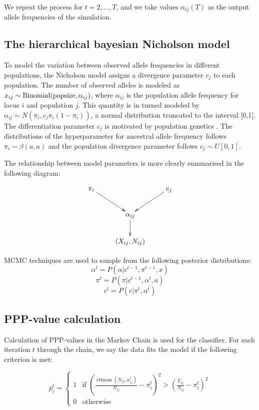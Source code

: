 \documentclass[a4paper,12pt]{article}
\begin{document}
   We repeat the process for $t=2, ..., T$, and we take values
   $\alpha_{ij}(T)$ as the output allele frequencies of the
   simulation.



\subsection{The hierarchical bayesian Nicholson model}

To model the variation between observed allele frequencies in
different populations, the Nicholson model assigns a divergence
parameter $c_j$ to each population. The number of observed alleles is
modeled as $x_{ij}\sim \operatorname{Binomial}(\text{popsize},\alpha_{ij})$, where $\alpha_{ij}$
is the population allele frequency for locus $i$ and population
$j$. This quantity is in turned modeled by $\alpha_{ij}\sim N(\pi_i,
c_j \pi_i(1-\pi_i))$, a normal distribution truncated to the interval
[0,1]. The differentiation parameter $c_j$ is motivated by population
genetics \cite[section 2.2]{nicholson}. The distributions of the
hyperparameter for ancestral allele frequency follows $\pi_i\sim
\beta(a,a)$ and the population divergence parameter follows $c_j\sim
U[0,1]$.

The relationship between model parameters is more clearly summarised
in the following diagram:

$$
\xymatrix{
  \pi_i \ar[rd] & & c_j \ar[ld] \\
  & \alpha_{ij} \ar[d] & \\
  & (X_{ij},N_{ij})
}
$$

MCMC techniques are used to sample from the following posterior distributions:
$$\alpha^t = P(\alpha|c^{t-1},\pi^{t-1},x)$$
$$\pi^t = P(\pi|c^{t-1},\alpha^t,a)$$
$$c^t = P(c|\pi^t,\alpha^t)$$

\subsection{PPP-value calculation}

Calculation of PPP-values in the Markov Chain is used for the
classifier. For each iteration $t$ through the chain, we say the data fits
the model if the following criterion is met:

$$
p_i^t =
\begin{cases}
1 & \text{if }\left(
\frac{\operatorname{rbinom}(N_{ij},\alpha_{ij}^t)}{N_{ij}} - \pi_i^t
\right)^2
>
\left(
\frac{Y_{ij}}{N_{ij}} - \pi_i^t
\right)^2\\
0 & \text{otherwise}
\end{cases}
$$
\end{document}
